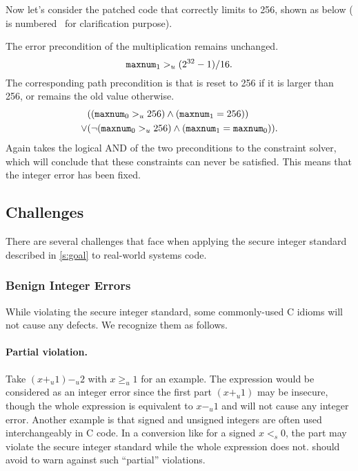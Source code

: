 Now let's consider the patched code that correctly limits 
to 256, shown as below ( is
numbered~\cite[\chapterautorefname~8.11]{whale} for clarification
purpose).

The error precondition of the multiplication remains unchanged.
\begin{equation*}
\texttt{maxnum}_1 >_u (2^{32} - 1) / 16.
\end{equation*}
The corresponding path precondition is that  is reset to 256
if it is larger than 256, or remains the old value otherwise.
\begin{align*}
& ((\texttt{maxnum}_0 >_u 256) \land (\texttt{maxnum}_1 = 256)) \\
\lor
& (\neg (\texttt{maxnum}_0 >_u 256) \land (\texttt{maxnum}_1 = \texttt{maxnum}_0)).
\end{align*}
Again \sys takes the logical AND of the two preconditions to the
constraint solver, which will conclude that these constraints can
never be satisfied.  This means that the integer error has been
fixed.

\subsection{Challenges}
\label{s:chal}

There are several challenges that face \sys when applying the
secure integer standard described in \autoref{s:goal} to real-world
systems code.

\subsubsection{Benign Integer Errors}

While violating the secure integer standard, some commonly-used C
idioms will not cause any defects.  We recognize them as follows.

\paragraph{Partial violation.}
Take $(x +_u 1) -_u 2$ with $x \geq_u 1$ for an example.  The
expression would be considered as an integer error since the first
part $(x +_u 1)$ may be insecure, though the whole expression is
equivalent to $x -_u 1$ and will not cause any integer error.
Another example is that signed and unsigned integers are often used
interchangeably in C code.  In a conversion like 
for a signed $x <_s 0$, the part  may violate the
secure integer standard while the whole expression does not.  \sys
should avoid to warn against such ``partial'' violations.

